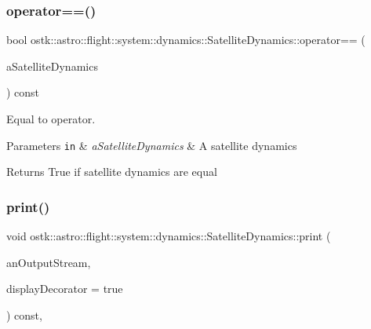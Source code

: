 \subsubsection{\texorpdfstring{operator==()}{operator==()}}
{\footnotesize\ttfamily bool ostk\+::astro\+::flight\+::system\+::dynamics\+::\+Satellite\+Dynamics\+::operator== (\begin{DoxyParamCaption}\item[{const \hyperlink{classostk_1_1astro_1_1flight_1_1system_1_1dynamics_1_1_satellite_dynamics}{Satellite\+Dynamics} \&}]{a\+Satellite\+Dynamics }\end{DoxyParamCaption}) const}



Equal to operator. 


\begin{DoxyParams}[1]{Parameters}
\mbox{\tt in}  & {\em a\+Satellite\+Dynamics} & A satellite dynamics \\
\hline
\end{DoxyParams}
\begin{DoxyReturn}{Returns}
True if satellite dynamics are equal 
\end{DoxyReturn}
\mbox{\label{classostk_1_1astro_1_1flight_1_1system_1_1dynamics_1_1_satellite_dynamics_af60a82bf97622e5b3a670c38ab4ddd32}} 
\subsubsection{\texorpdfstring{print()}{print()}}
{\footnotesize\ttfamily void ostk\+::astro\+::flight\+::system\+::dynamics\+::\+Satellite\+Dynamics\+::print (\begin{DoxyParamCaption}\item[{std\+::ostream \&}]{an\+Output\+Stream,  }\item[{bool}]{display\+Decorator = {\ttfamily true} }\end{DoxyParamCaption}) const\hspace{0.3cm}{\ttfamily [override]}, {\ttfamily [virtual]}}



